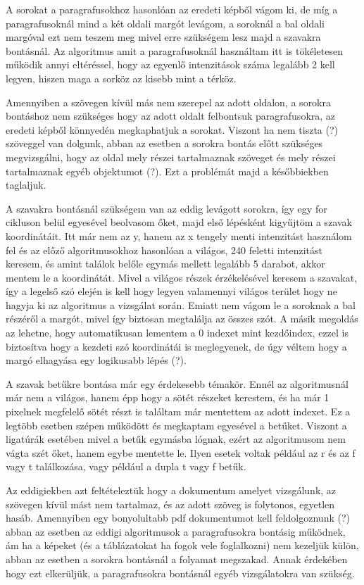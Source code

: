 A sorokat a paragrafusokhoz hasonlóan az eredeti képből vágom ki, de míg a paragrafusoknál mind a két oldali margót levágom, a soroknál a bal oldali margóval ezt nem teszem meg mivel erre szükségem lesz majd a szavakra bontásnál. Az algoritmus amit a paragrafusoknál használtam itt is tökéletesen működik annyi eltéréssel, hogy az egyenlő intenzitások száma legalább 2 kell legyen, hiszen maga a sorköz az kisebb mint a térköz.

Amennyiben a szövegen kívül más nem szerepel az adott oldalon, a sorokra bontáshoz nem szükséges hogy az adott oldalt felbontsuk paragrafusokra, az eredeti képből könnyedén megkaphatjuk a sorokat. Viszont ha nem tiszta (?) szöveggel van dolgunk, abban az esetben a sorokra bontás előtt szükséges megvizsgálni, hogy az oldal mely részei tartalmaznak szöveget és mely részei tartalmaznak egyéb objektumot (?). Ezt a problémát majd a későbbiekben taglaljuk.

A szavakra bontásnál szükségem van az eddig levágott sorokra, így egy for cikluson belül egyesével beolvasom őket, majd első lépésként kigyűjtöm a szavak koordinátáit. Itt már nem az y, hanem az x tengely menti intenzitást használom fel és az előző algoritmusokhoz hasonlóan a világos, 240 feletti intenzitást keresem, és amint találok belőle egymás mellett legalább 5 darabot, akkor mentem le a koordinátát. Mivel a világos részek érzékelésével keresem a szavakat, így a legelső szó elején is kell hogy legyen valamennyi világos terület hogy ne hagyja ki az algoritmus a vizsgálat során. Emiatt nem vágom le a soroknak a bal részéről a margót, mivel így biztosan megtalálja az összes szót. A másik megoldás az lehetne, hogy automatikusan lementem a 0 indexet mint kezdőindex, ezzel is biztosítva hogy a kezdeti szó koordinátái is meglegyenek, de úgy véltem hogy a margó elhagyása egy logikusabb lépés (?).

A szavak betűkre bontása már egy érdekesebb témakör. Ennél az algoritmusnál már nem a világos, hanem épp hogy a sötét részeket kerestem, és ha már 1 pixelnek megfelelő sötét részt is találtam már mentettem az adott indexet. Ez a legtöbb esetben szépen működött és megkaptam egyesével a betűket. Viszont a ligatúrák esetében mivel a betűk egymásba lógnak, ezért az algoritmusom nem vágta szét őket, hanem egybe mentette le. Ilyen esetek voltak például az r és az f vagy t találkozása, vagy például a dupla t vagy f betűk.

Az eddigiekben azt feltételeztük hogy a dokumentum amelyet vizsgálunk, az szövegen kívül mást nem tartalmaz, és az adott szöveg is folytonos, egyetlen hasáb. Amennyiben egy bonyolultabb pdf dokumentumot kell feldolgoznunk (?) abban az esetben az eddigi algoritmusok a paragrafusokra bontásig működnek, ám ha a képeket (és a táblázatokat ha fogok vele foglalkozni) nem kezeljük külön, abban az esetben a sorokra bontásnál a folyamat megszakad. Annak érdekében hogy ezt elkerüljük, a paragrafusokra bontásnál egyéb vizsgálatokra van szükség.

